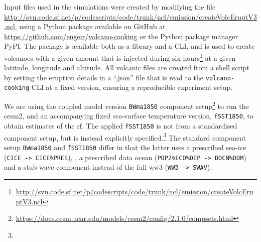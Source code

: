\documentclass{ametsocV6.1}
\begin{document}


\appendix

\appendix[A]


Input files used in the simulations were created by modifying the file
\url{http://svn.code.sf.net/p/codescripts/code/trunk/ncl/emission/createVolcEruptV3.ncl},
using a Python package available on GitHub at
\url{https://github.com/engeir/volcano-cooking} or the Python package manager PyPI\@.
The package is available both as a library and a CLI, and is used to create volcanoes
with a given  amount that is injected during six
hours\footnote{\url{http://svn.code.sf.net/p/codescripts/code/trunk/ncl/emission/createVolcEruptV3.ncl}}
at a given latitude, longitude and altitude. All volcanic  files are created
from a shell script by setting the eruption details in a ``.json'' file that is read to
the \texttt{volcano-cooking} CLI at a fixed version, ensuring a reproducible experiment
setup.

We are using the coupled model version \texttt{BWma1850} component
setup\footnote{\url{https://docs.cesm.ucar.edu/models/cesm2/config/2.1.0/compsets.html}}
to run the \gls{cesm2}, and an accompanying fixed sea-surface temperature version,
\texttt{fSST1850}, to obtain estimates of the \gls{rf}. The applied \texttt{fSST1850} is
not from a standardised component setup, but is instead explicitly
specified.\footnote{\fssturl} The standard component setup \texttt{BWma1850} and
\texttt{fSST1850} differ in that the latter uses a prescribed sea-ice (\texttt{CICE ->
  CICE\%PRES}), , a prescribed data ocean (\texttt{POP2\%ECO\%DEP -> DOCN\%DOM}) and a
stub wave component instead of the full \gls{ww3} (\texttt{WW3 -> SWAV}).
\end{document}
